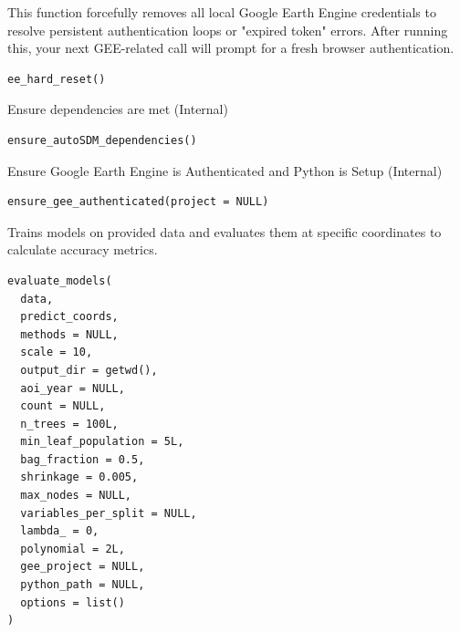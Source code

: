 \documentclass[letterpaper]{book}
\begin{document}
%
\begin{Description}
This function forcefully removes all local Google Earth Engine credentials
to resolve persistent authentication loops or "expired token" errors.
After running this, your next GEE-related call will prompt for a fresh browser authentication.
\end{Description}
%
\begin{Usage}
\begin{verbatim}
ee_hard_reset()
\end{verbatim}
\end{Usage}
%
\begin{Description}
Ensure dependencies are met (Internal)
\end{Description}
%
\begin{Usage}
\begin{verbatim}
ensure_autoSDM_dependencies()
\end{verbatim}
\end{Usage}
%
\begin{Description}
Ensure Google Earth Engine is Authenticated and Python is Setup (Internal)
\end{Description}
%
\begin{Usage}
\begin{verbatim}
ensure_gee_authenticated(project = NULL)
\end{verbatim}
\end{Usage}
%
\begin{Description}
Trains models on provided data and evaluates them at specific coordinates to calculate accuracy metrics.
\end{Description}
%
\begin{Usage}
\begin{verbatim}
evaluate_models(
  data,
  predict_coords,
  methods = NULL,
  scale = 10,
  output_dir = getwd(),
  aoi_year = NULL,
  count = NULL,
  n_trees = 100L,
  min_leaf_population = 5L,
  bag_fraction = 0.5,
  shrinkage = 0.005,
  max_nodes = NULL,
  variables_per_split = NULL,
  lambda_ = 0,
  polynomial = 2L,
  gee_project = NULL,
  python_path = NULL,
  options = list()
)
\end{verbatim}
\end{Usage}
\end{document}
